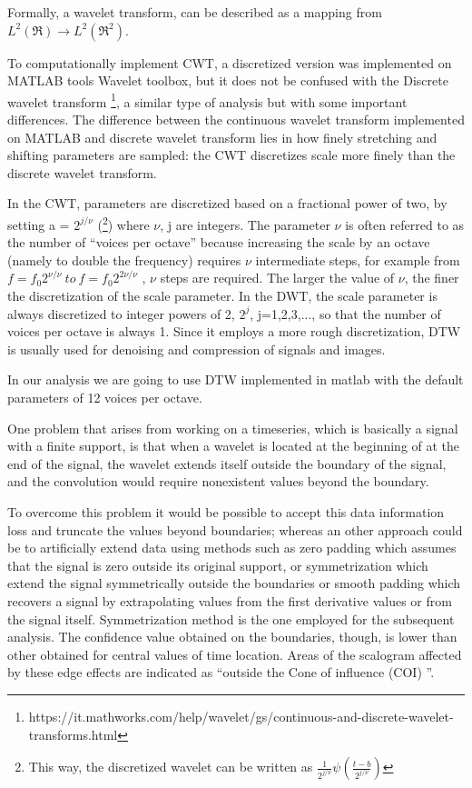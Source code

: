 \documentclass[11pt]{report}
\begin{document}
Formally, a wavelet transform, can be described as a mapping from $L^2(\Re) \rightarrow L^2(\Re^2)$.

To computationally implement CWT, a discretized version was implemented on MATLAB tools Wavelet toolbox, but it does not be confused with the Discrete wavelet transform \footnote{https://it.mathworks.com/help/wavelet/gs/continuous-and-discrete-wavelet-transforms.html}, a similar type of analysis but with some important differences.
The difference between the continuous wavelet transform implemented on MATLAB and discrete wavelet transform lies in how finely stretching and shifting parameters are sampled: the CWT discretizes scale more finely than the discrete wavelet transform.

In the CWT, parameters are discretized based on a fractional power of two, by setting a = $2^{j/\nu}$  (\footnote{This way, the discretized wavelet can be written as $\frac{1}{2^{j/\nu}} \psi\left ( \frac{t-b}{2^{j/\nu}}\right )$ }) \cite{liu-1994} \cite{dabauchies-1992} where $\nu $, j are integers.
The parameter $\nu$ is often referred to as the number of “voices per octave” because increasing the scale by an octave (namely to double the frequency) requires $\nu$ intermediate steps, for example from $f = f_0 2^{\nu/\nu} \ to \ f = f_0 2^{2\nu/\nu}$ , $\nu$ steps are required.
The larger the value of $\nu$, the finer the discretization of the scale parameter.
In the DWT, the scale parameter is always discretized to integer powers of 2, $2^j$, j=1,2,3,..., so that the number of voices per octave is always 1.
Since it employs a more rough discretization, DTW is usually used for denoising and compression of signals and images.

In our analysis we are going to use DTW implemented in matlab with the default parameters of 12 voices per octave.


One problem that arises from working on a timeseries, which is basically a signal with a finite support, is that when a wavelet is located at the beginning of at the end of the signal, the wavelet extends itself outside the boundary of the signal, and the convolution would require nonexistent values beyond the boundary.

To overcome this problem it would be possible to accept this data information loss and truncate the values beyond boundaries; whereas an other approach could be to artificially extend data using methods such as zero padding which assumes that the signal is zero outside its original support, or symmetrization which extend the signal symmetrically outside the boundaries or smooth padding which recovers a signal by extrapolating values from the first derivative values or from the signal itself.
Symmetrization method is the one employed for the subsequent analysis.
The confidence value obtained on the boundaries, though, is lower than other obtained for central values of time location.
Areas of the scalogram affected by these edge effects are indicated as \textquotedblleft outside the Cone of influence (COI) \textquotedblright.
\end{document}
